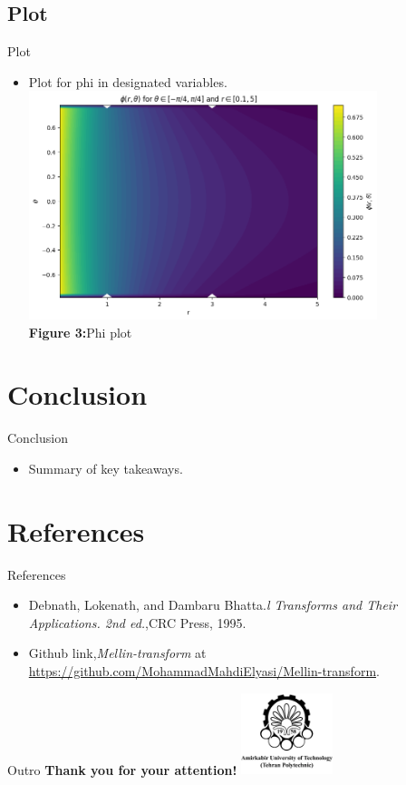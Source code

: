 \documentclass{beamer}
\begin{document}
\subsection{Plot}
\begin{frame}{Plot}
    \begin{itemize}
        \item Plot for phi in designated variables.
        \vfill %
        \centering
        \includegraphics[width=0.8\textwidth]{Phi.png} %
        \\[0.2cm] %
        {\small \textbf {Figure 3:}Phi plot} %
    \end{itemize}
\end{frame}

\section{Conclusion}
\begin{frame}{Conclusion}
    \begin{itemize}
        \item Summary of key takeaways.
    \end{itemize}
\end{frame}

\section{References}
\begin{frame}{References}
    \begin{itemize}
        \item Debnath, Lokenath, and Dambaru Bhatta.\textit{l Transforms and Their Applications. 2nd ed.},CRC Press, 1995.
        \item  Github link,\textit{Mellin-transform} at \url{https://github.com/MohammadMahdiElyasi/Mellin-transform}.
    \end{itemize}
\end{frame}

\begin{frame}{Outro}
    \centering
    {\Large \textbf{Thank you for your attention!}} \vspace{1cm} %
    \vfill %
    \includegraphics[width=0.2\textwidth]{amirkabir.png} %
\end{frame}
\end{document}
